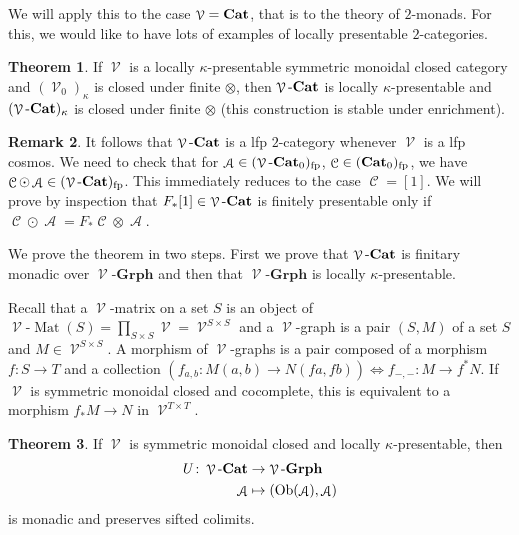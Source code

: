 \documentclass[a4paper,11pt,oneside,openany]{scrbook}
\newcommand{\catname}[1]{{\normalfont\textbf{#1}}}
\newcommand{\Cat}{\catname{Cat}}
\newcommand{\from}{\colon}
\DeclareMathOperator{\V}{\mathcal{V}}
\DeclareMathOperator{\A}{\mathcal{A}}
\DeclareMathOperator{\C}{\mathcal{C}}
\DeclareMathOperator{\Ob}{Ob}
\DeclareMathOperator{\Mat}{Mat}
\DeclareMathOperator{\copw}{\odot}
\theoremstyle{definition}
\newtheorem{thm}{Theorem}[section] %
\theoremstyle{definition}
\newtheorem{rmk}[thm]{Remark}
\begin{document}
We will apply this to the case $\V=\Cat$, that is to the theory of $2$-monads. For this, we would like to have lots of examples of locally presentable $2$-categories.
\begin{thm}\label{lkp}
If $\V$ is a locally $\kappa$-presentable symmetric monoidal closed category and $(\V_0)_\kappa$ is closed under finite $\otimes$, then $\V\mbox{-}\Cat$ is locally $\kappa$-presentable and $(\V\mbox{-}\Cat)_\kappa$ is closed under finite $\otimes$ (this construction is stable under enrichment).
\end{thm}
\begin{rmk}
   It follows that $\V\mbox{-}\Cat$ is a lfp $2$-category whenever $\V$ is a lfp cosmos. We need to check that for $\A\in(\V\mbox{-}\Cat_0)_{\text{fp}}$, $\C\in(\Cat_0)_{\text{fp}}$, we have $\C\copw\A\in(\V\mbox{-}\Cat)_{\text{fp}}$. This immediately reduces to the case $\C=[1]$. We will prove by inspection that $F_*[1]\in\V\mbox{-}\Cat$ is finitely presentable only if $\C\copw\A=F_*\C\otimes\A$.
\end{rmk}
We prove the theorem in two steps. First we prove that $\V\mbox{-}\Cat$ is finitary monadic over $\V\mbox{-}\mathbf{Grph}$ and then that $\V\mbox{-}\mathbf{Grph}$ is locally $\kappa$-presentable.
\par
Recall that a $\V$-matrix on a set $S$ is an object of $\V\mbox{-}\Mat(S)=\prod_{S\times S}\V=\V^{S\times S}$ and a $\V$-graph is a pair $(S,M)$ of a set $S$ and $M\in\V^{S\times S}$. A morphism of $\V$-graphs is a pair composed of a morphism $f\from S\rightarrow T$ and a collection $(f_{a,b}\colon M(a,b)\to N(fa,fb))\iff f_{-,-}\colon M\rightarrow f^*N$. If $\V$ is symmetric monoidal closed and cocomplete, this is equivalent to a morphism $f_*M\to N$ in $\V^{T\times T}$.
\begin{thm}
If $\V$ is symmetric monoidal closed and locally $\kappa$-presentable, then 
\begin{align*}
    U\colon\V\mbox{-}\Cat&\to\V\mbox{-}\mathbf{Grph}\\
    \A&\mapsto(\Ob(\A),\A)
\end{align*}
is monadic and preserves sifted colimits.
\end{thm}
\end{document}
